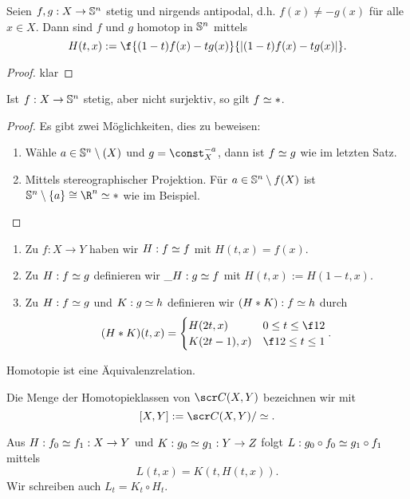 \begin{st}
	Seien $f,g : X \to \S^n$ stetig und nirgends antipodal, d.h. $f(x) \neq -g(x)$ für alle $x \in X$.
	Dann sind $f$ und $g$ homotop in $\S^n$ mittels
	\[
		H(t,x) := \f {(1-t)f(x) - tg(x)}{|(1-t)f(x) - tg(x)|}.
	\]
	\begin{proof}
		klar
	\end{proof}
\end{st}

\begin{kor}
	Ist $f: X \to \S^n$ stetig, aber nicht surjektiv, so gilt $f \homotopic *$.
	\begin{proof}
		Es gibt zwei Möglichkeiten, dies zu beweisen:
		\begin{enumerate}[1.]
			\item
				Wähle $a \in \S^n \setminus (X)$ und $g = \const_X^{-a}$, dann ist $f \homotopic g$ wie im letzten Satz.
			\item
				Mittels stereographischer Projektion.
				Für $a \in \S^n \setminus f(X)$ ist $\S^n \setminus \{a\} \homeomorphic \R^n \homotopic *$ wie im Beispiel.
		\end{enumerate}
	\end{proof}
\end{kor}

\begin{df}
	\begin{enumerate}[(1)]
		\item
			Zu $f: X \to Y$ haben wir $H: f \homotopic f$ mit $H(t,x) = f(x)$.
		\item
			Zu $H: f \homotopic g$ definieren wir $\_H: g \homotopic f$ mit $H(t,x) := H(1-t,x)$.
		\item
			Zu $H: f \homotopic g$ und $K: g\homotopic h$ definieren wir $(H \ast K) : f \homotopic h$ durch
			\[
				(H \ast K)(t,x) = \begin{cases}
					H(2t, x) & 0 \le t \le \f 12 \\
					K(2t-1), x) & \f 12 \le t \le 1
				\end{cases}.
			\]
	\end{enumerate}
	Homotopie ist eine Äquivalenzrelation.
\end{df}

\begin{df}
	Die Menge der Homotopieklassen von $\scr C(X, Y)$ bezeichnen wir mit
	\[
		[X,Y] := \scr C(X, Y) / \homotopic.
	\]
\end{df}

\begin{st}
	Aus $H: f_0 \homotopic f_1 : X \to Y$ und $K: g_0 \homotopic g_1: Y \to Z$ folgt $L: g_0 \circ f_0 \homotopic g_1 \circ f_1$ mittels
	\[
		L(t, x) = K(t, H(t,x)).
	\]
	Wir schreiben auch $L_t = K_t \circ H_t$.
\end{st}

